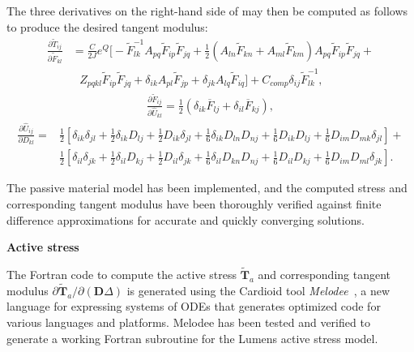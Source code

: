 The three derivatives on the right-hand side of  may then be computed as follows to produce the desired tangent modulus:
\begin{equation}
\begin{aligned}
\frac{\partial \tilde{T}_{ij}}{\partial \tilde{F}_{kl}} &= \frac{C}{2J}e^{Q} \Bigg[-\tilde{F}^{-1}_{lk}A_{pq}\tilde{F}_{ip}\tilde{F}_{jq} + \frac{1}{2}(A_{ln}\tilde{F}_{kn} + A_{ml}\tilde{F}_{km})A_{pq}\tilde{F}_{ip}\tilde{F}_{jq} + \\
&\text{\ \ \ }Z_{pqkl}\tilde{F}_{ip}\tilde{F}_{jq} + \delta_{ik}A_{pl}\tilde{F}_{jp} + \delta_{jk}A_{lq}\tilde{F}_{iq}\Bigg] + C_{comp}\delta_{ij}\tilde{F}^{-1}_{lk},
\end{aligned}
\end{equation}
\vspace{-5mm}
\begin{align}
\frac{\partial \tilde{F}_{ij}}{\partial \hat{U}_{kl}} = \frac{1}{2}\left(\delta_{ik}\overline{F}_{lj} + \delta_{il}\overline{F}_{kj}\right),
\end{align}
\vspace{-5mm}
\begin{equation}
\begin{aligned}
\frac{\partial \hat{U}_{ij}}{\partial D_{kl}} = &\frac{1}{2}\left[\delta_{ik}\delta_{jl} + \frac{1}{2}\delta_{ik}D_{lj} + \frac{1}{2}D_{ik}\delta_{jl} + \frac{1}{6}\delta_{ik}D_{ln}D_{nj} + \frac{1}{6}D_{ik}D_{lj} + \frac{1}{6}D_{im}D_{mk}\delta_{jl}\right] + \\
&\frac{1}{2}\left[\delta_{il}\delta_{jk} + \frac{1}{2}\delta_{il}D_{kj} + \frac{1}{2}D_{il}\delta_{jk} + \frac{1}{6}\delta_{il}D_{kn}D_{nj} + \frac{1}{6}D_{il}D_{kj} + \frac{1}{6}D_{im}D_{ml}\delta_{jk}\right].
\end{aligned}
\end{equation}

The passive material model has been implemented, and the computed stress and corresponding tangent modulus have been thoroughly verified against finite difference approximations for accurate and quickly converging solutions.

\textbf{Active stress}

The Fortran code to compute the active stress $\tilde{\bm{T}}_a$ and corresponding tangent modulus ${\partial \tilde{\bm{T}}_a}/{\partial (\bm{D}\Delta)}$ is generated using the Cardioid tool \textit{Melodee}~\cite{melodee}, a new language for expressing systems of ODEs that generates optimized code for various languages and platforms. Melodee has been tested and verified to generate a working Fortran subroutine for the Lumens active stress model.

